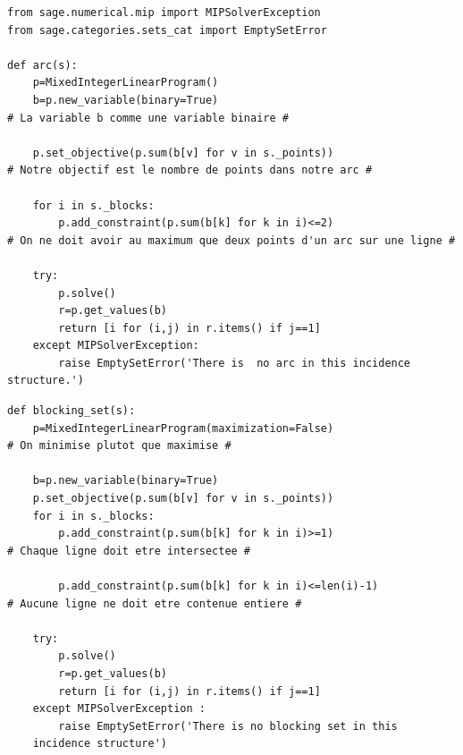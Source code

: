 \documentclass[a4paper]{article}
\begin{document}
\begin{lstlisting}
from sage.numerical.mip import MIPSolverException
from sage.categories.sets_cat import EmptySetError
          
def arc(s):   
    p=MixedIntegerLinearProgram()
    b=p.new_variable(binary=True)
# La variable b comme une variable binaire #

    p.set_objective(p.sum(b[v] for v in s._points))
# Notre objectif est le nombre de points dans notre arc #

    for i in s._blocks:
        p.add_constraint(p.sum(b[k] for k in i)<=2)
# On ne doit avoir au maximum que deux points d'un arc sur une ligne #
        
    try:
        p.solve()
        r=p.get_values(b)
        return [i for (i,j) in r.items() if j==1]
    except MIPSolverException:
        raise EmptySetError('There is  no arc in this incidence structure.')
\end{lstlisting}
\newpage
\begin{lstlisting}
def blocking_set(s):
    p=MixedIntegerLinearProgram(maximization=False)
# On minimise plutot que maximise #

    b=p.new_variable(binary=True)
    p.set_objective(p.sum(b[v] for v in s._points))
    for i in s._blocks:
        p.add_constraint(p.sum(b[k] for k in i)>=1)
# Chaque ligne doit etre intersectee #

        p.add_constraint(p.sum(b[k] for k in i)<=len(i)-1)
# Aucune ligne ne doit etre contenue entiere #
        
    try:
        p.solve()
        r=p.get_values(b)
        return [i for (i,j) in r.items() if j==1]
    except MIPSolverException :
        raise EmptySetError('There is no blocking set in this
    incidence structure')  
\end{lstlisting}
\newpage
\thispagestyle{empty}
\end{document}
